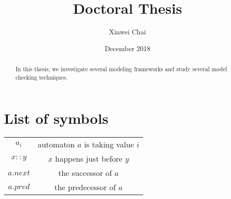 \documentclass[12pt]{report}
\title{Doctoral Thesis}
\date{December 2018}
\author{Xinwei Chai}
\begin{document}
\maketitle
\tableofcontents
\listoffigures
\listoftables
\begin{abstract}
    In this thesis, we investigate several modeling frameworks and study several model checking techniques.
    
\end{abstract}

\chapter*{List of symbols}
\begin{tabular}{c|c}
   $a_i$  & automaton $a$ is taking value $i$ \\
    $x::y$ &  $x$ happens just before $y$\\
    $a.next$&the successor of $a$\\
     $a.pred$ & the predecessor of $a$
\end{tabular}






















\appendix

\end{document}
